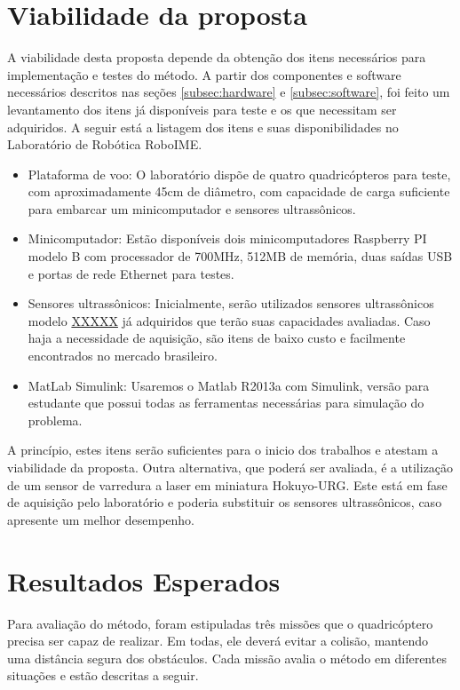 \documentclass[a4paper, 12pt]{article}
\begin{document}
\newpage

\section{Viabilidade da proposta}
\label{sec:viabilidade}

A viabilidade desta proposta depende da obtenção dos itens necessários para implementação e testes do método. A partir dos componentes e software necessários descritos nas seções \ref{subsec:hardware} e \ref{subsec:software}, foi feito um levantamento dos itens já disponíveis para teste e os que necessitam ser adquiridos. A seguir está a listagem dos itens e suas disponibilidades no Laboratório de Robótica RoboIME.

\begin{itemize}
	\item
	Plataforma de voo:  O laboratório dispõe de quatro quadricópteros para teste, com aproximadamente 45cm de diâmetro, com capacidade de carga suficiente para embarcar um minicomputador e sensores ultrassônicos.
	\item
	Minicomputador: Estão disponíveis dois minicomputadores Raspberry PI modelo B com processador de 700MHz, 512MB de memória, duas saídas USB e portas de rede Ethernet para testes.
	\item
	Sensores ultrassônicos: Inicialmente, serão utilizados sensores ultrassônicos modelo \underline{XXXXX} já adquiridos que terão suas capacidades avaliadas. Caso haja a necessidade de aquisição, são itens de baixo custo e facilmente encontrados no mercado brasileiro.
	\item
	MatLab Simulink: Usaremos o Matlab R2013a com Simulink, versão para estudante que possui todas as ferramentas necessárias para simulação do problema. 

\end{itemize}

A princípio, estes itens serão suficientes para o inicio dos trabalhos e atestam a viabilidade da proposta. Outra alternativa, que poderá ser avaliada, é a utilização de um sensor de varredura a laser em miniatura Hokuyo-URG. Este está em fase de aquisição pelo laboratório e poderia substituir os sensores ultrassônicos, caso apresente um melhor desempenho.

\newpage

\section{Resultados Esperados}
\label{sec:resultados}
 Para avaliação do método, foram estipuladas três missões que o quadricóptero precisa ser capaz de realizar. Em todas, ele deverá evitar a colisão, mantendo uma distância segura dos obstáculos. Cada missão avalia o método em diferentes situações e estão descritas a seguir.
 
\end{document}

